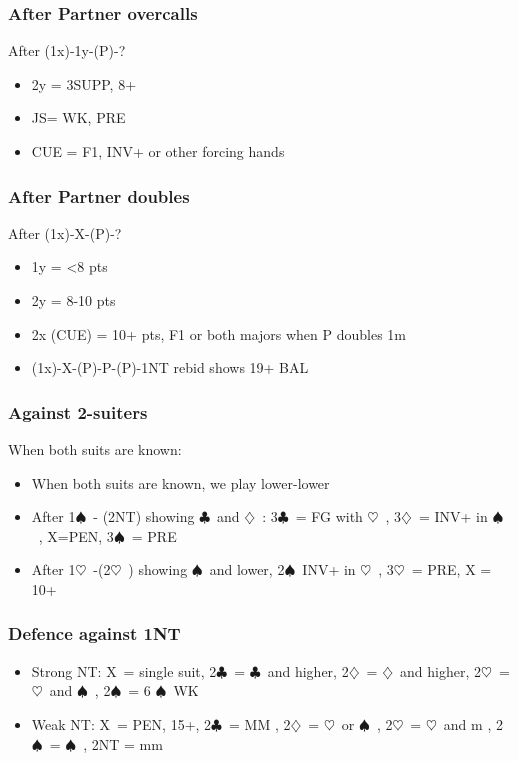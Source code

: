 \documentclass{article}
\newcommand\C{\ensuremath{\clubsuit}}
\newcommand\D{\ensuremath{\diamondsuit}}
\renewcommand\H{\ensuremath{\heartsuit}}
\renewcommand\S{\ensuremath{\spadesuit}}
\newcommand\X{{\footnotesize X}}
\begin{document}
\begin{multicols}{2}
  \subsubsection{After Partner overcalls}
  After (1x)-1y-(P)-?
  \begin{itemize}
    \item 2y = 3SUPP, 8+
     \item JS= WK, PRE
     \item CUE = F1, INV+ or other forcing hands
  \end{itemize}
  \subsubsection{After Partner doubles}
  After (1x)-X-(P)-?
  \begin{itemize}
    \item 1y = <8 pts
    \item 2y = 8-10 pts
    \item 2x (CUE) = 10+ pts, F1 or both majors when P doubles 1m
     \item (1x)-X-(P)-P-(P)-1NT rebid shows 19+ BAL
  \end{itemize}
  \subsubsection{Against 2-suiters}
  \label{twosdefence}
  When both suits are known:
  \begin{itemize}
    \item When both suits are known, we play lower-lower
    \item After 1\S\ - (2NT) showing \C\ and \D\ : 3\C\ = FG with \H\ , 3\D\ = INV+ in \S\ , X=PEN, 3\S\ = PRE
    \item After 1\H\ -(2\H\ ) showing \S\ and lower, 2\S\ INV+ in \H\ , 3\H\ = PRE, X = 10+ 
    \end{itemize}
  \subsubsection{Defence against 1NT}
  \label{oneNTdef}
  \begin{itemize}
    \item Strong NT: \X\ = single suit, 2\C\ = \C\ and higher, 2\D\ = \D\ and higher, 2\H\ = \H\ and \S\ , 2\S\ = 6 \S\ WK
    \item Weak NT: \X\ = PEN, 15+, 2\C\ = MM , 2\D\ = \H\ or \S\ , 2\H\ = \H\ and m , 2\S\ =  \S\ , 2NT = mm
    \end{itemize}
\end{multicols}
\end{document}
